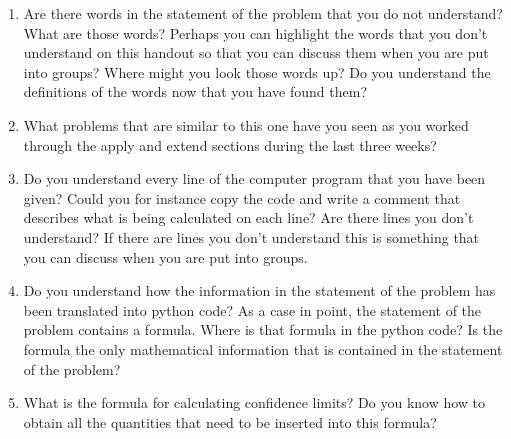 \documentclass[a4paper]{article}
\begin{document}
\begin{enumerate}
 \item Are there words in the statement of the problem that you do not understand?  What are those words?  Perhaps you can highlight the words that you don't understand on this handout so that you can 
discuss them when you are put into groups?  Where might you look those words up?  Do you understand the definitions of the words now that you have found them?

 \item What problems that are similar to this one have you seen as you worked through the apply and extend sections during the last three weeks?
 
 \item Do you understand every line of the computer program that you have been given?  Could you for instance copy the code and write a comment that describes what is being calculated on each line?  
Are there lines you don't understand?  If there are lines you don't understand this is something that you can discuss when you are put into groups.  

 \item Do you understand how the information in the statement of the problem has been translated into python code?  As a case in point, the statement of the problem contains a formula.  Where is that 
formula in the python code?  Is the formula the only mathematical information that is contained in the statement of the problem? 
 
 \item What is the formula for calculating confidence limits?  Do you know how to obtain all the quantities that need to be inserted into this formula?  
\end{enumerate}
\end{document}
